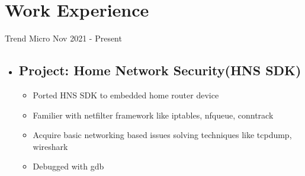 \section{Work Experience}

{Trend Micro}
{Nov 2021 - Present}
{}

\begin{itemize}
  \item \subsection*{\textbf{Project: Home Network Security(HNS SDK)}}
    \begin{itemize}
        \setlength\topsep{0em}
        \setlength\parskip{0em}
        \setlength\parsep{0em}
        \setlength\itemsep{0em}
      \item Ported HNS SDK to embedded home router device
      \item Familier with netfilter framework like iptables, nfqueue, conntrack
      \item Acquire basic networking based issues solving techniques like tcpdump, wireshark
      \item Debugged with gdb
    \end{itemize}
\end{itemize}


